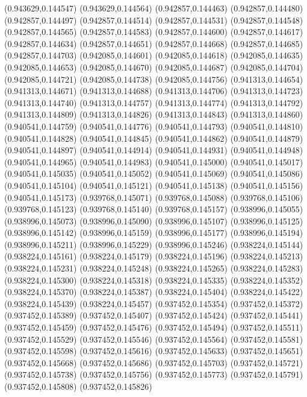 (0.943629,0.144547)
(0.943629,0.144564)
(0.942857,0.144463)
(0.942857,0.144480)
(0.942857,0.144497)
(0.942857,0.144514)
(0.942857,0.144531)
(0.942857,0.144548)
(0.942857,0.144565)
(0.942857,0.144583)
(0.942857,0.144600)
(0.942857,0.144617)
(0.942857,0.144634)
(0.942857,0.144651)
(0.942857,0.144668)
(0.942857,0.144685)
(0.942857,0.144703)
(0.942085,0.144601)
(0.942085,0.144618)
(0.942085,0.144635)
(0.942085,0.144653)
(0.942085,0.144670)
(0.942085,0.144687)
(0.942085,0.144704)
(0.942085,0.144721)
(0.942085,0.144738)
(0.942085,0.144756)
(0.941313,0.144654)
(0.941313,0.144671)
(0.941313,0.144688)
(0.941313,0.144706)
(0.941313,0.144723)
(0.941313,0.144740)
(0.941313,0.144757)
(0.941313,0.144774)
(0.941313,0.144792)
(0.941313,0.144809)
(0.941313,0.144826)
(0.941313,0.144843)
(0.941313,0.144860)
(0.940541,0.144759)
(0.940541,0.144776)
(0.940541,0.144793)
(0.940541,0.144810)
(0.940541,0.144828)
(0.940541,0.144845)
(0.940541,0.144862)
(0.940541,0.144879)
(0.940541,0.144897)
(0.940541,0.144914)
(0.940541,0.144931)
(0.940541,0.144948)
(0.940541,0.144965)
(0.940541,0.144983)
(0.940541,0.145000)
(0.940541,0.145017)
(0.940541,0.145035)
(0.940541,0.145052)
(0.940541,0.145069)
(0.940541,0.145086)
(0.940541,0.145104)
(0.940541,0.145121)
(0.940541,0.145138)
(0.940541,0.145156)
(0.940541,0.145173)
(0.939768,0.145071)
(0.939768,0.145088)
(0.939768,0.145106)
(0.939768,0.145123)
(0.939768,0.145140)
(0.939768,0.145157)
(0.938996,0.145055)
(0.938996,0.145073)
(0.938996,0.145090)
(0.938996,0.145107)
(0.938996,0.145125)
(0.938996,0.145142)
(0.938996,0.145159)
(0.938996,0.145177)
(0.938996,0.145194)
(0.938996,0.145211)
(0.938996,0.145229)
(0.938996,0.145246)
(0.938224,0.145144)
(0.938224,0.145161)
(0.938224,0.145179)
(0.938224,0.145196)
(0.938224,0.145213)
(0.938224,0.145231)
(0.938224,0.145248)
(0.938224,0.145265)
(0.938224,0.145283)
(0.938224,0.145300)
(0.938224,0.145318)
(0.938224,0.145335)
(0.938224,0.145352)
(0.938224,0.145370)
(0.938224,0.145387)
(0.938224,0.145404)
(0.938224,0.145422)
(0.938224,0.145439)
(0.938224,0.145457)
(0.937452,0.145354)
(0.937452,0.145372)
(0.937452,0.145389)
(0.937452,0.145407)
(0.937452,0.145424)
(0.937452,0.145441)
(0.937452,0.145459)
(0.937452,0.145476)
(0.937452,0.145494)
(0.937452,0.145511)
(0.937452,0.145529)
(0.937452,0.145546)
(0.937452,0.145564)
(0.937452,0.145581)
(0.937452,0.145598)
(0.937452,0.145616)
(0.937452,0.145633)
(0.937452,0.145651)
(0.937452,0.145668)
(0.937452,0.145686)
(0.937452,0.145703)
(0.937452,0.145721)
(0.937452,0.145738)
(0.937452,0.145756)
(0.937452,0.145773)
(0.937452,0.145791)
(0.937452,0.145808)
(0.937452,0.145826)

